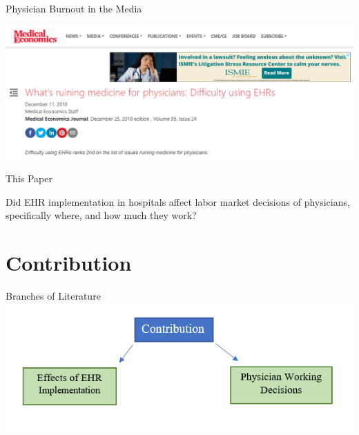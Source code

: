 \documentclass[10pt]{beamer}
\begin{document}
\begin{frame}[noframenumbering]{Physician Burnout in the Media}
\begin{center}
    \includegraphics[scale=.45]{graphics/News Clip3.PNG}
\end{center}
\end{frame}

\begin{frame}{This Paper}

Did EHR implementation in hospitals affect labor market decisions of physicians, specifically where, and how much they work?
    
\end{frame}


\section{Contribution}

\begin{frame}{Branches of Literature}
\centering
\includegraphics[scale=.5]{graphics/Contribution_litgraphic.PNG}

\end{frame}
\end{document}
